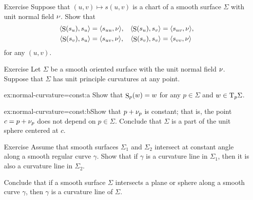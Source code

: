 \begin{thm}{Exercise}\label{ex:shape-chart}
Suppose that $(u,v)\mapsto s(u,v)$ is a chart of a smooth surface $\Sigma$ with unit normal field $\nu$.
Show that 
\begin{align*}
\langle \mathop{\rm S}\nolimits(s_u), s_u\rangle 
&=\langle s_{uu},\nu\rangle,
&
\langle \mathop{\rm S}\nolimits(s_u), s_v\rangle 
&=\langle s_{uv},\nu\rangle,
\\
\langle \mathop{\rm S}\nolimits(s_v), s_u\rangle 
&=\langle s_{uv},\nu\rangle,
&
\langle \mathop{\rm S}\nolimits(s_v), s_v\rangle 
&=\langle s_{vv},\nu\rangle
\end{align*}
for any $(u,v)$.

\end{thm}

\begin{thm}{Exercise}\label{ex:normal-curvature=const}
Let $\Sigma$ be a smooth oriented surface with the unit normal field $\nu$.
Suppose that $\Sigma$ has unit principle curvatures at any point.

\begin{subthm}{ex:normal-curvature=const:a} Show that $\mathop{\rm S}\nolimits_p(w)=w$ for any $p\in\Sigma$ and $w\in \mathrm{T}_p\Sigma$.
\end{subthm}

\begin{subthm}{ex:normal-curvature=const:b}Show that $p+\nu_p$ is constant; that is, the point $c=p+\nu_p$ does not depend on $p\in\Sigma$.
Conclude that $\Sigma$ is a part of the unit sphere centered at $c$.
\end{subthm}

\end{thm}

\begin{thm}{Exercise}\label{ex:shape-curvature-line}
Assume that smooth surfaces $\Sigma_1$ and $\Sigma_2$ intersect at constant angle along a smooth regular curve $\gamma$.
Show that if $\gamma$ is a curvature line in $\Sigma_1$, then it is also a curvature line in $\Sigma_2$.

Conclude that if a smooth surface $\Sigma$ intersects a plane or sphere along a smooth curve $\gamma$,
then $\gamma$ is a curvature line of $\Sigma$.
\end{thm}
